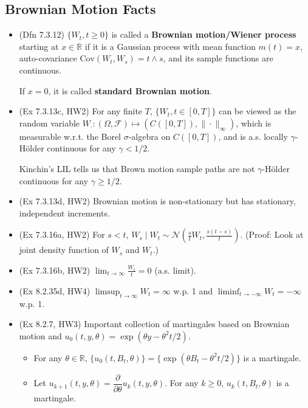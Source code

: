 \documentclass[twoside]{article}
\newcommand{\dis}{\displaystyle}
\newcommand\bbR{\mathbb{R}}
\newcommand\calF{\mathcal{F}}
\newcommand\calN{\mathcal{N}}
\newcommand\Om{\Omega}
\newcommand\sg{\sigma}
\def\t{\theta}
\newcommand\goesto{\rightarrow}
\begin{document}
\subsection*{Brownian Motion Facts}
\begin{itemize}
\item (Dfn 7.3.12) $\{W_t, t \geq 0\}$ is called a \textbf{Brownian motion/Wiener process} starting at $x \in \bbR$ if it is a Gaussian process with mean function $m(t) = x$, auto-covariance $\text{Cov}(W_t, W_s) = t \wedge s$, and its sample functions are continuous.

If $x=0$, it is called \textbf{standard Brownian motion}.

\item (Ex 7.3.13c, HW2) For any finite $T$, $\{ W_t, t \in [0,T]\}$ can be viewed as the random variable $W_\cdot: (\Om, \calF) \mapsto (C([0,T]), \|\cdot\|_\infty)$, which is measurable w.r.t. the Borel $\sg$-algebra on $C([0,T])$, and is a.s. locally $\gamma$-H\"{o}lder continuous for any $\gamma < 1/2$.

Kinchin's LIL tells us that Brown motion sample paths are not $\gamma$-H\"{o}lder continuous for any $\gamma \geq 1/2$.

\item (Ex 7.3.13d, HW2) Brownian motion is non-stationary but has stationary, independent increments.

\item (Ex 7.3.16a, HW2) For $s < t$, $W_s \mid W_t \sim \calN \left( \displaystyle\frac{s}{t} W_t, \displaystyle\frac{s(t-s)}{t} \right)$. (Proof: Look at joint density function of $W_s$ and $W_t$.)

\item (Ex 7.3.16b, HW2) $\displaystyle\lim_{t \goesto \infty} \frac{W_t}{t} = 0$ (a.s. limit).

\item (Ex 8.2.35d, HW4) $\dis\limsup_{t \goesto \infty} W_t = \infty$ w.p. 1 and $\dis\liminf_{t \goesto -\infty} W_t = -\infty$ w.p. 1.

\item (Ex 8.2.7, HW3) Important collection of martingales based on Brownian motion and $u_0(t, y, \t) = \exp (\t y - \t^2 t /2)$.
\begin{itemize}
\item For any $\t \in \bbR$, $\{ u_0(t, B_t, \t)\} = \{ \exp (\t B_t - \t^2 t / 2) \}$ is a martingale.

\item Let $u_{k+1}(t,y,\t) = \dfrac{\partial}{\partial \t} u_k(t, y, \t)$. For any $k \geq 0$, $u_k(t, B_t, \t)$ is a martingale.


\end{itemize}
\end{itemize}
\end{document}
